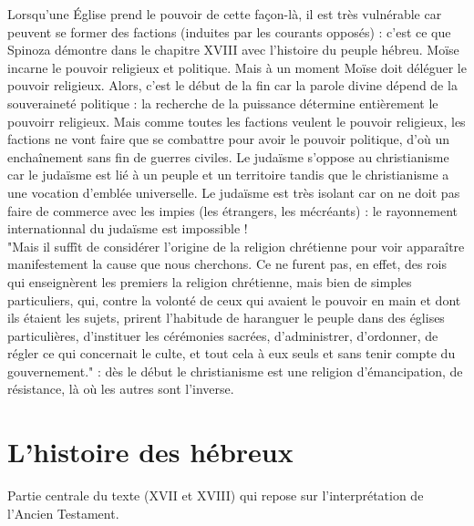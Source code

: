 \documentclass[a4paper,12pt]{article}
\begin{document}
Lorsqu'une Église prend le pouvoir de cette façon-là, il est très vulnérable car peuvent se former des factions (induites par les courants opposés) : c'est ce que Spinoza démontre dans le chapitre XVIII avec l'histoire du peuple hébreu. Moïse incarne le pouvoir religieux et politique. Mais à un moment Moïse doit déléguer le pouvoir religieux. Alors, c'est le début de la fin car la parole divine dépend de la souveraineté politique : la recherche de la puissance détermine entièrement le pouvoirr religieux. Mais comme toutes les factions veulent le pouvoir religieux, les factions ne vont faire que se combattre pour avoir le pouvoir politique, d'où un enchaînement sans fin de guerres civiles.
Le judaïsme s'oppose au christianisme car le judaïsme est lié à un peuple et un territoire tandis que le christianisme a une vocation d'emblée universelle. Le judaïsme est très isolant car on ne doit pas faire de commerce avec les impies (les étrangers, les mécréants) : le rayonnement internationnal du judaïsme est impossible !\\
"Mais il suffît de considérer l’origine de la religion chrétienne pour voir apparaître manifestement la cause que nous cherchons. Ce ne furent pas, en effet, des rois qui enseignèrent les premiers la religion chrétienne, mais bien de  simples particuliers, qui, contre la volonté de ceux qui avaient le pouvoir en main et dont ils étaient les sujets, prirent l’habitude de haranguer le peuple dans des églises particulières, d’instituer les cérémonies sacrées, d’administrer, d’ordonner, de régler ce qui concernait le culte, et tout cela à eux seuls et sans tenir compte du gouvernement." : dès le début le christianisme est une religion d'émancipation, de résistance, là où les autres sont l'inverse.

\section{L'histoire des hébreux}

Partie centrale du texte (XVII et XVIII) qui repose sur l'interprétation de l'Ancien Testament.\\\\
\end{document}
